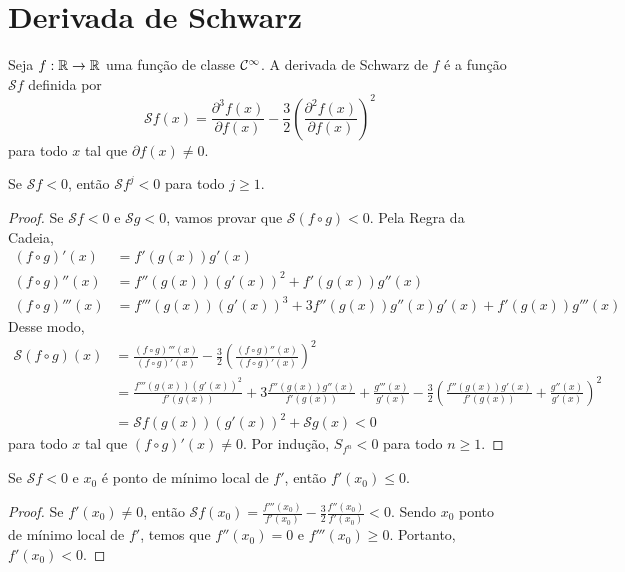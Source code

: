 \section{Derivada de Schwarz}

\begin{definition}
Seja $f: \mathbb{R} \to \mathbb{R}$ uma função de classe $\mathcal{C}^\infty$.  A derivada de Schwarz de $f$ é a função $\mathcal{S} f$ definida por
$$\mathcal{S} f(x) = \frac{\partial^3 f(x)}{\partial f(x)} - \frac{3}{2} \left( \frac{\partial^2 f(x)}{\partial f(x)} \right)^2$$
para todo $x$ tal que $\partial f(x) \neq 0$.
\end{definition}

\begin{lemma}
Se $\mathcal{S} f < 0$, então $\mathcal{S} f^j < 0$ para todo $j \geq 1$.
\end{lemma}

\begin{proof}
Se $\mathcal{S} f < 0$ e $\mathcal{S} g < 0$, vamos provar que $\mathcal{S} (f \circ g) < 0$. Pela Regra da Cadeia,
\begin{align*}
(f \circ g)'(x) & = f'(g(x))g'(x) \\
(f \circ g)''(x) & = f''(g(x))(g'(x))^2 + f'(g(x))g''(x) \\
(f \circ g)'''(x) & = f'''(g(x))(g'(x))^3 + 3f''(g(x))g''(x)g'(x) + f'(g(x))g'''(x)
\end{align*}
Desse modo,
\begin{align*}
\mathcal{S} (f \circ g)(x) & = \frac{(f \circ g)'''(x)}{(f \circ g)'(x)} - \frac{3}{2} \left( \frac{(f \circ g)''(x)}{(f \circ g)'(x)} \right)^2 \\
& = \frac{f'''(g(x))(g'(x))^2}{f'(g(x))} + 3\frac{f''(g(x))g''(x)}{f'(g(x))} + \frac{g'''(x)}{g'(x)} - \frac{3}{2}\left( \frac{f''(g(x))g'(x)}{f'(g(x))} + \frac{g''(x)}{g'(x)} \right)^2 \\
& = \mathcal{S} f(g(x)) (g'(x))^2 + \mathcal{S} g(x) < 0
\end{align*}
para todo $x$ tal que $(f \circ g)'(x) \neq 0$. Por indução, $S_{f^n} < 0$ para todo $n \geq 1$.
\end{proof}

\begin{lemma}
\label{lemma1}
Se $\mathcal{S} f < 0$ e $x_0$ é ponto de mínimo local de $f'$, então $f'(x_0) \leq 0$.
\end{lemma}

\begin{proof}
Se $f'(x_0) \neq 0$, então $\mathcal{S} f(x_0) = \frac{f'''(x_0)}{f'(x_0)} - \frac{3}{2} \frac{f''(x_0)}{f'(x_0)} < 0$. Sendo $x_0$ ponto de mínimo local de $f'$, temos que $f''(x_0) = 0$ e $f'''(x_0) \geq 0$. Portanto,  $f'(x_0) < 0$. 
\end{proof}

